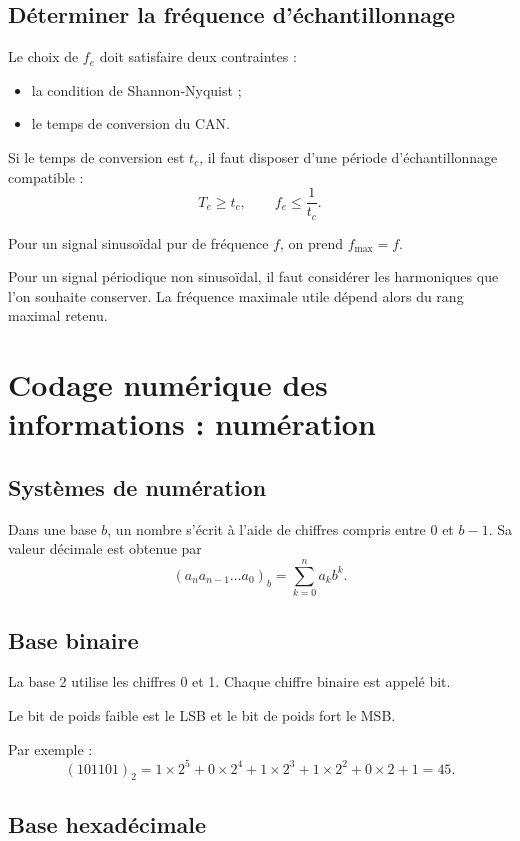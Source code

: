 \subsection{Déterminer la fréquence d'échantillonnage}

Le choix de $f_e$ doit satisfaire deux contraintes :
\begin{itemize}
  \item la condition de Shannon-Nyquist ;
  \item le temps de conversion du CAN.
\end{itemize}

Si le temps de conversion est $t_c$, il faut disposer d'une période d'échantillonnage compatible :
\[
T_e\geq t_c,
\qquad
f_e\leq \frac{1}{t_c}.
\]

Pour un signal sinusoïdal pur de fréquence $f$, on prend $f_{\max}=f$.

Pour un signal périodique non sinusoïdal, il faut considérer les harmoniques que l'on souhaite conserver. La fréquence maximale utile dépend alors du rang maximal retenu.

\section{Codage numérique des informations : numération}\label{sec:elec-numeration}

\subsection{Systèmes de numération}

Dans une base $b$, un nombre s'écrit à l'aide de chiffres compris entre $0$ et $b-1$. Sa valeur décimale est obtenue par
\[
(a_na_{n-1}\ldots a_0)_b=\sum_{k=0}^{n}a_kb^k.
\]

\subsection{Base binaire}

La base 2 utilise les chiffres 0 et 1. Chaque chiffre binaire est appelé bit.

Le bit de poids faible est le LSB et le bit de poids fort le MSB.

Par exemple :
\[
(101101)_2=1\times2^5+0\times2^4+1\times2^3+1\times2^2+0\times2+1=45.
\]

\subsection{Base hexadécimale}

